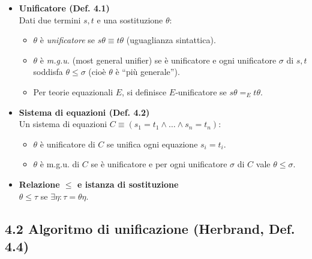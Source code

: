 \documentclass[12pt]{article}
\begin{document}
\begin{itemize}
  \item \textbf{Unificatore (Def. 4.1)}\\
    Dati due termini $s,t$ e una sostituzione $\theta$:
    \begin{itemize}
      \item $\theta$ è \emph{unificatore} se $s\theta \equiv t\theta$ (uguaglianza sintattica).
      \item $\theta$ è \emph{m.g.u.} (most general unifier) se è unificatore e ogni unificatore $\sigma$ di $s,t$ soddisfa $\theta \leq \sigma$ (cioè $\theta$ è “più generale”).
      \item Per teorie equazionali $E$, si definisce $E$‐unificatore se $s\theta =_E t\theta$.
    \end{itemize}

  \item \textbf{Sistema di equazioni (Def. 4.2)}\\
    Un sistema di equazioni $C \equiv (s_1 = t_1 \land \dots \land s_n = t_n)$:
    \begin{itemize}
      \item $\theta$ è unificatore di $C$ se unifica ogni equazione $s_i = t_i$.
      \item $\theta$ è m.g.u. di $C$ se è unificatore e per ogni unificatore $\sigma$ di $C$ vale $\theta \leq \sigma$.
    \end{itemize}

  \item \textbf{Relazione $\leq$ e istanza di sostituzione}\\
    $\theta \leq \tau$ se $\exists \eta: \tau = \theta \eta$.
\end{itemize}

\subsection*{4.2 Algoritmo di unificazione (Herbrand, Def. 4.4)}
\end{document}
